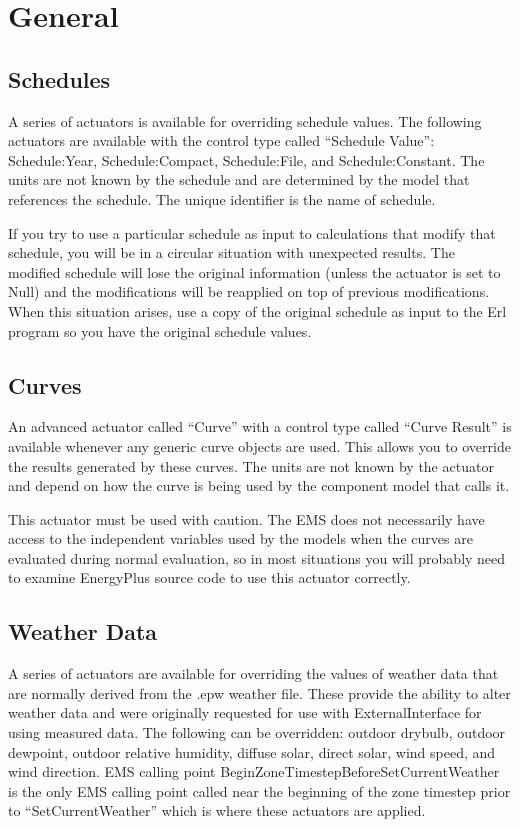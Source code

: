 \section{General}\label{general}

\subsection{Schedules}\label{schedules}

A series of actuators is available for overriding schedule values. The following actuators are available with the control type called ``Schedule Value'':~ Schedule:Year, Schedule:Compact, Schedule:File, and Schedule:Constant. The units are not known by the schedule and are determined by the model that references the schedule. The unique identifier is the name of schedule.

If you try to use a particular schedule as input to calculations that modify that schedule, you will be in a circular situation with unexpected results. The modified schedule will lose the original information (unless the actuator is set to Null) and the modifications will be reapplied on top of previous modifications. When this situation arises, use a copy of the original schedule as input to the Erl program so you have the original schedule values.

\subsection{Curves}\label{curves}

An advanced actuator called ``Curve'' with a control type called ``Curve Result'' is available whenever any generic curve objects are used. This allows you to override the results generated by these curves. The units are not known by the actuator and depend on how the curve is being used by the component model that calls it.

This actuator must be used with caution. The EMS does not necessarily have access to the independent variables used by the models when the curves are evaluated during normal evaluation, so in most situations you will probably need to examine EnergyPlus source code to use this actuator correctly.

\subsection{Weather Data}\label{weather-data}

A series of actuators are available for overriding the values of weather data that are normally derived from the .epw weather file. These provide the ability to alter weather data and were originally requested for use with ExternalInterface for using measured data. The following can be overridden: outdoor drybulb, outdoor dewpoint, outdoor relative humidity, diffuse solar, direct solar, wind speed, and wind direction. EMS calling point BeginZoneTimestepBeforeSetCurrentWeather is the only EMS calling point called near the beginning of the zone timestep prior to ``SetCurrentWeather'' which is where these actuators are applied.

